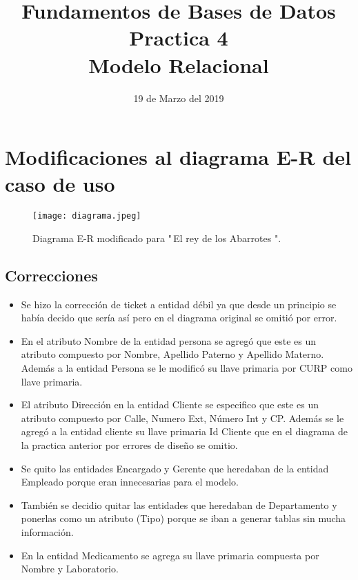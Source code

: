 \documentclass[10pt]{article}
\begin{document}
	\title{Fundamentos de Bases de Datos \\
		Practica 4\\ Modelo Relacional
	} 
	\author{}
	\date{19 de Marzo del 2019}
	\maketitle
	
	
	\section{Modificaciones al diagrama E-R del caso de uso}
	\begin{figure}[H]
		\centering
		\texttt{[image: diagrama.jpeg]}
		\caption{Diagrama E-R modificado para "\,El rey de los Abarrotes ".}
	\end{figure}

   \subsection{Correcciones}
   
   \begin{itemize}
   	\item Se hizo la corrección de ticket a entidad débil ya que desde un principio se había decido que sería así pero en el diagrama original se omitió por error.
   	
   	\item En el atributo Nombre de la entidad persona se agregó que este es un atributo compuesto por Nombre, Apellido Paterno y Apellido Materno. Además a  la entidad Persona se le modificó su llave primaria por CURP como llave primaria. 
   	
   	\item El atributo Dirección en la entidad Cliente se especifico que este es un atributo compuesto por Calle, Numero Ext, Número Int y CP. Además se le agregó a la entidad cliente su llave primaria Id Cliente que en el diagrama de la practica anterior por errores de diseño se omitio.
   	
   	\item Se quito las entidades Encargado y Gerente que heredaban de la entidad Empleado porque eran innecesarias para el modelo.
   	
   	\item También se decidio quitar las entidades que heredaban de Departamento y ponerlas como un atributo (Tipo) porque se iban a generar tablas sin mucha información.
   	
   	\item En la entidad Medicamento se agrega su llave primaria compuesta por Nombre y Laboratorio.  
   \end{itemize}
   
\end{document}
